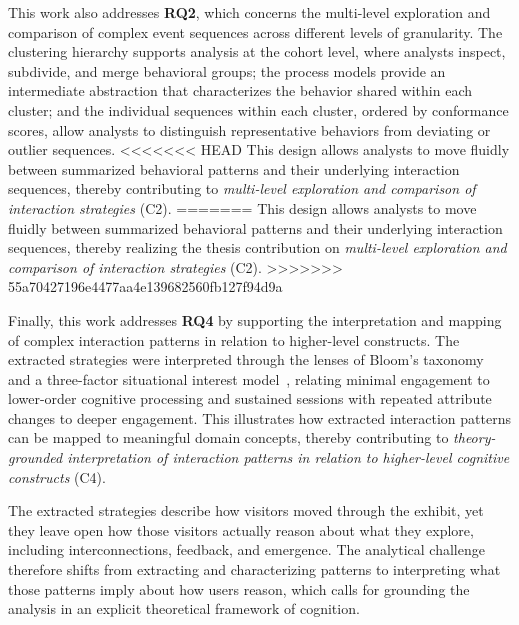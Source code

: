 This work also addresses \textbf{RQ2}, which concerns the multi-level exploration and comparison of complex event sequences across different levels of granularity.
The clustering hierarchy supports analysis at the cohort level, where analysts inspect, subdivide, and merge behavioral groups; the process models provide an intermediate abstraction that characterizes the behavior shared within each cluster; and the individual sequences within each cluster, ordered by conformance scores, allow analysts to distinguish representative behaviors from deviating or outlier sequences.
<<<<<<< HEAD
This design allows analysts to move fluidly between summarized behavioral patterns and their underlying interaction sequences, thereby contributing to \textit{multi-level exploration and comparison of interaction strategies} (C2).
=======
This design allows analysts to move fluidly between summarized behavioral patterns and their underlying interaction sequences, thereby realizing the thesis contribution on \textit{multi-level exploration and comparison of interaction strategies} (C2).
>>>>>>> 55a70427196e4477aa4e139682560fb127f94d9a

Finally, this work addresses \textbf{RQ4} by supporting the interpretation and mapping of complex interaction patterns in relation to higher-level constructs.
The extracted strategies were interpreted through the lenses of Bloom's taxonomy~\cite{anderson2001taxonomy, bloom1956taxonomy} and a three-factor situational interest model~\cite{lisa2010measuring}, relating minimal engagement to lower-order cognitive processing and sustained sessions with repeated attribute changes to deeper engagement.
This illustrates how extracted interaction patterns can be mapped to meaningful domain concepts, thereby contributing to \textit{theory-grounded interpretation of interaction patterns in relation to higher-level cognitive constructs} (C4).

The extracted strategies describe how visitors moved through the exhibit, yet they leave open how those visitors actually reason about what they explore, including interconnections, feedback, and emergence.
The analytical challenge therefore shifts from extracting and characterizing patterns to interpreting what those patterns imply about how users reason, which calls for grounding the analysis in an explicit theoretical framework of cognition.




\label{cha:pub4}

